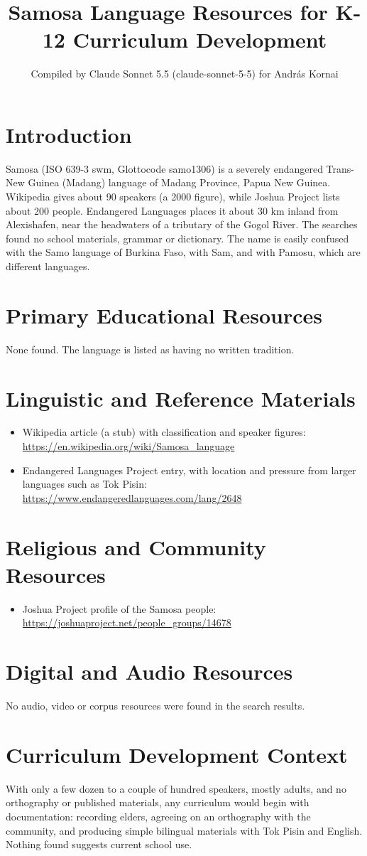 \documentclass[12pt]{article}
\title{Samosa Language Resources for K-12 Curriculum Development}
\author{Compiled by Claude Sonnet 5.5 (claude-sonnet-5-5) for Andr\'as Kornai}
\date{}
\begin{document}
\maketitle

\section{Introduction}
Samosa (ISO 639-3 swm, Glottocode samo1306) is a severely endangered Trans-New Guinea (Madang) language of Madang Province, Papua New Guinea. Wikipedia gives about 90 speakers (a 2000 figure), while Joshua Project lists about 200 people. Endangered Languages places it about 30 km inland from Alexishafen, near the headwaters of a tributary of the Gogol River. The searches found no school materials, grammar or dictionary. The name is easily confused with the Samo language of Burkina Faso, with Sam, and with Pamosu, which are different languages.

\section{Primary Educational Resources}
None found. The language is listed as having no written tradition.

\section{Linguistic and Reference Materials}
\begin{itemize}
\item Wikipedia article (a stub) with classification and speaker figures: \url{https://en.wikipedia.org/wiki/Samosa_language}
\item Endangered Languages Project entry, with location and pressure from larger languages such as Tok Pisin: \url{https://www.endangeredlanguages.com/lang/2648}
\end{itemize}

\section{Religious and Community Resources}
\begin{itemize}
\item Joshua Project profile of the Samosa people: \url{https://joshuaproject.net/people_groups/14678}
\end{itemize}

\section{Digital and Audio Resources}
No audio, video or corpus resources were found in the search results.

\section{Curriculum Development Context}
With only a few dozen to a couple of hundred speakers, mostly adults, and no orthography or published materials, any curriculum would begin with documentation: recording elders, agreeing on an orthography with the community, and producing simple bilingual materials with Tok Pisin and English. Nothing found suggests current school use.
\end{document}
